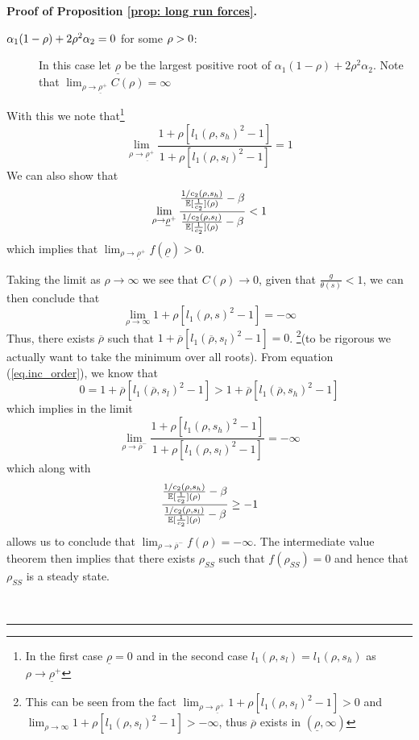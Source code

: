\documentclass[thmsb,11pt]{article}
\newenvironment{proof}[1][Proof]{\noindent \textbf{#1.} }{\  \rule{0.5em}{0.5em}}
\begin{document}
{\begin{proof}[Proof of Proposition \ref{prop: long run forces}]
\begin{description}
\begin{description}
\item[$\protect\alpha_1(1-\protect\rho)+2\protect\rho^2\protect\alpha_2 = 0$
for some $\protect\rho>0$:] In this case let $\underline \rho$ be the
largest positive root of $\alpha_1(1-\rho)+2\rho^2\alpha_2$. Note that $%
\lim_{\rho\rightarrow \underline \rho^+}C(\rho) = \infty$
\end{description}

With this we note that\footnote{In the first case $\underline {\rho}=0$ and in the second case $l_1(\rho,s_l)=l_1(\rho,s_h)$ as $\rho \to \underline{\rho}^{+}$}
\begin{equation*}
\lim_{\rho\rightarrow \underline \rho^+} \frac{1+\rho[l_1(\rho,s_h)^2-1]}{1+%
\rho[l_1(\rho,s_l)^2-1]} = 1
\end{equation*}%
We can also show that
\begin{equation*}
\lim_{\rho\rightarrow\underline \rho^+} \frac{\frac{1/c_2(\rho,s_h)}{\mathbb{%
E}[\frac1{c_2}](\rho)}-\beta }{\frac{1/c_2(\rho,s_l)}{\mathbb{E}%
[\frac1{c_2}](\rho)}-\beta} < 1
\end{equation*}
which implies that $\lim_{\rho\rightarrow \underline \rho^+} f(\underline
\rho) > 0$.

Taking the limit as $\rho\rightarrow\infty$ we see that $C(\rho)\rightarrow
0 $, given that $\frac g{\theta(s)} <1$, we can then conclude that
\begin{equation*}
\lim_{\rho\rightarrow\infty } 1+ \rho[l_1(\rho,s)^2-1] = -\infty
\end{equation*}
Thus, there exists $\overline \rho$ such that $1+\overline \rho[%
l_1(\overline \rho,s_l)^2-1] = 0$. \footnote{This can be seen from the fact $\lim_{\rho\rightarrow \underline
\rho^+} 1+\rho[l_1(\rho,s_l)^2 -1] > 0$ and $\lim_{\rho\rightarrow \infty } 1+\rho[l_1(\rho,s_l)^2 -1] > -\infty$, thus $\overline{\rho}$ exists in $(\underline{\rho},\infty)$ }(to be rigorous we actually want to
take the minimum over all roots). From equation (\ref{eq.inc_order}), we
know that
\begin{equation*}
0 = 1+\overline \rho[l_1(\overline \rho,s_l)^2-1] > 1+\overline \rho[%
l_1(\overline \rho,s_h)^2-1]
\end{equation*}
which implies in the limit
\begin{equation*}
\lim_{\rho\rightarrow \overline \rho^-}\frac{1+\rho[l_1(\rho,s_h)^2-1]}{1+%
\rho[l_1(\rho,s_l)^2-1]} = -\infty
\end{equation*}
which along with
\begin{equation*}
\frac{\frac{1/c_2(\rho,s_h)}{\mathbb{E}[\frac1{c_2}](\rho)}-\beta }{\frac{%
1/c_2(\rho,s_l)}{\mathbb{E}[\frac1{c_2}](\rho)}-\beta} \geq -1
\end{equation*}
allows us to conclude that $\lim_{\rho\rightarrow \overline \rho^-} f(\rho)
= -\infty$. The intermediate value theorem then implies that there exists $%
\rho_{SS}$ such that $f(\rho_{SS}) = 0$ and hence that $\rho_{SS}$ is a
steady state.


\end{description}
\end{proof}}
\end{document}
